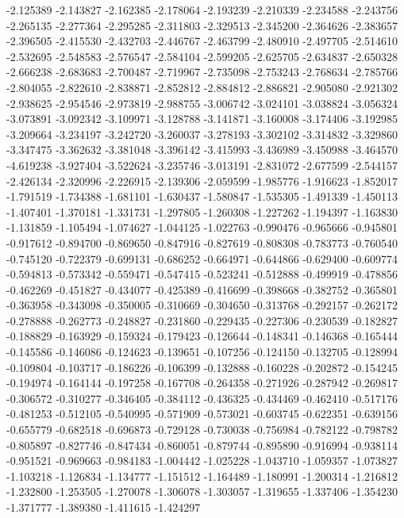 -2.125389
-2.143827
-2.162385
-2.178064
-2.193239
-2.210339
-2.234588
-2.243756
-2.265135
-2.277364
-2.295285
-2.311803
-2.329513
-2.345200
-2.364626
-2.383657
-2.396505
-2.415530
-2.432703
-2.446767
-2.463799
-2.480910
-2.497705
-2.514610
-2.532695
-2.548583
-2.576547
-2.584104
-2.599205
-2.625705
-2.634837
-2.650328
-2.666238
-2.683683
-2.700487
-2.719967
-2.735098
-2.753243
-2.768634
-2.785766
-2.804055
-2.822610
-2.838871
-2.852812
-2.884812
-2.886821
-2.905080
-2.921302
-2.938625
-2.954546
-2.973819
-2.988755
-3.006742
-3.024101
-3.038824
-3.056324
-3.073891
-3.092342
-3.109971
-3.128788
-3.141871
-3.160008
-3.174406
-3.192985
-3.209664
-3.234197
-3.242720
-3.260037
-3.278193
-3.302102
-3.314832
-3.329860
-3.347475
-3.362632
-3.381048
-3.396142
-3.415993
-3.436989
-3.450988
-3.464570
-4.619238
-3.927404
-3.522624
-3.235746
-3.013191
-2.831072
-2.677599
-2.544157
-2.426134
-2.320996
-2.226915
-2.139306
-2.059599
-1.985776
-1.916623
-1.852017
-1.791519
-1.734388
-1.681101
-1.630437
-1.580847
-1.535305
-1.491339
-1.450113
-1.407401
-1.370181
-1.331731
-1.297805
-1.260308
-1.227262
-1.194397
-1.163830
-1.131859
-1.105494
-1.074627
-1.044125
-1.022763
-0.990476
-0.965666
-0.945801
-0.917612
-0.894700
-0.869650
-0.847916
-0.827619
-0.808308
-0.783773
-0.760540
-0.745120
-0.722379
-0.699131
-0.686252
-0.664971
-0.644866
-0.629400
-0.609774
-0.594813
-0.573342
-0.559471
-0.547415
-0.523241
-0.512888
-0.499919
-0.478856
-0.462269
-0.451827
-0.434077
-0.425389
-0.416699
-0.398668
-0.382752
-0.365801
-0.363958
-0.343098
-0.350005
-0.310669
-0.304650
-0.313768
-0.292157
-0.262172
-0.278888
-0.262773
-0.248827
-0.231860
-0.229435
-0.227306
-0.230539
-0.182827
-0.188829
-0.163929
-0.159324
-0.179423
-0.126644
-0.148341
-0.146368
-0.165444
-0.145586
-0.146086
-0.124623
-0.139651
-0.107256
-0.124150
-0.132705
-0.128994
-0.109804
-0.103717
-0.186226
-0.106399
-0.132888
-0.160228
-0.202872
-0.154245
-0.194974
-0.164144
-0.197258
-0.167708
-0.264358
-0.271926
-0.287942
-0.269817
-0.306572
-0.310277
-0.346405
-0.384112
-0.436325
-0.434469
-0.462410
-0.517176
-0.481253
-0.512105
-0.540995
-0.571909
-0.573021
-0.603745
-0.622351
-0.639156
-0.655779
-0.682518
-0.696873
-0.729128
-0.730038
-0.756984
-0.782122
-0.798782
-0.805897
-0.827746
-0.847434
-0.860051
-0.879744
-0.895890
-0.916994
-0.938114
-0.951521
-0.969663
-0.984183
-1.004442
-1.025228
-1.043710
-1.059357
-1.073827
-1.103218
-1.126834
-1.134777
-1.151512
-1.164489
-1.180991
-1.200314
-1.216812
-1.232800
-1.253505
-1.270078
-1.306078
-1.303057
-1.319655
-1.337406
-1.354230
-1.371777
-1.389380
-1.411615
-1.424297
